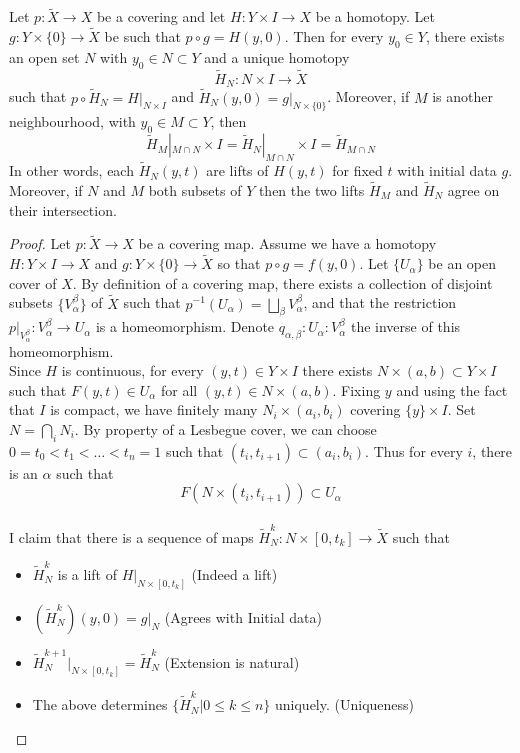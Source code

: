 \documentclass[a4paper]{article}
\begin{document}
\begin{lmm}{}{} Let $p:\widetilde{X}\to X$ be a covering and let $H:Y\times I\to X$ be a homotopy. Let $g:Y\times\{0\}\to\widetilde{X}$ be such that $p\circ g=H(y,0)$. Then for every $y_0\in Y$, there exists an open set $N$ with $y_0\in N\subset Y$ and a unique homotopy $$\widetilde{H}_N:N\times I\to\widetilde{X}$$ such that $p\circ\widetilde{H}_N=H|_{N\times I}$ and $\widetilde{H}_N(y,0)=g|_{N\times\{0\}}$. Moreover, if $M$ is another neighbourhood, with $y_0\in M\subset Y$, then $$\widetilde{H}_M|_{M\cap N}\times I=\widetilde{H}_N|_{M\cap N}\times I=\widetilde{H}_{M\cap N}$$
In other words, each $\widetilde{H}_N(y,t)$ are lifts of $H(y,t)$ for fixed $t$ with initial data $g$. Moreover, if $N$ and $M$ both subsets of $Y$ then the two lifts $\widetilde{H}_M$ and $\widetilde{H}_N$ agree on their intersection. 
\begin{proof}
Let $p:\widetilde{X}\to X$ be a covering map. Assume we have a homotopy $H:Y\times I\to X$ and $g:Y\times\{0\}\to\widetilde{X}$ so that $p\circ g=f(y,0)$. Let $\{U_\alpha\}$ be an open cover of $X$. By definition of a covering map, there exists a collection of disjoint subsets $\{V_\alpha^\beta\}$ of $\widetilde{X}$ such that $p^{-1}(U_\alpha)=\bigsqcup_{\beta}V_{\alpha}^\beta$, and that the restriction $p|_{V_\alpha^\beta}:V_\alpha^\beta\to U_\alpha$ is a homeomorphism. Denote $q_{\alpha,\beta}:U_\alpha:V_\alpha^\beta$ the inverse of this homeomorphism. \\
Since $H$ is continuous, for every $(y,t)\in Y\times I$ there exists $N\times(a,b)\subset Y\times I$ such that $F(y,t)\in U_\alpha$ for all $(y,t)\in N\times(a,b)$. Fixing $y$ and using the fact that $I$ is compact, we have finitely many $N_i\times(a_i,b_i)$ covering $\{y\}\times I$. Set $N=\bigcap_iN_i$. By property of a Lesbegue cover, we can choose $0=t_0<t_1<\dots<t_n=1$ such that $(t_i,t_{i+1})\subset (a_i,b_i)$. Thus for every $i$, there is an $\alpha$ such that $$F(N\times(t_i,t_{i+1}))\subset U_\alpha$$~\\
I claim that there is a sequence of maps $\widetilde{H}_N^k:N\times[0,t_k]\to\widetilde{X}$ such that 
\begin{itemize}
\item $\widetilde{H}_N^k$ is a lift of $H|_{N\times[0,t_k]}$ (Indeed a lift)
\item $(\widetilde{H}_N^k)(y,0)=g|_N$ (Agrees with Initial data)
\item $\widetilde{H}_N^{k+1}|_{N\times[0,t_k]}=\widetilde{H}_N^k$ (Extension is natural)
\item The above determines $\{\widetilde{H}_N^k|0\leq k\leq n\}$ uniquely. (Uniqueness)

\end{itemize}
\end{proof}
\end{lmm}
\end{document}

